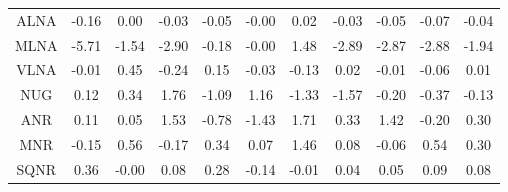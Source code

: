 \documentclass[11pt,a4paper]{report}
\begin{document}
\begin{longtable}{ | c || c | c | c | c | c | c | c | c | c || c |}
ALNA &  \cellcolor[HTML]{FFFFFF} -0.16 &  \cellcolor[HTML]{FFFFFF} 0.00 &  \cellcolor[HTML]{FFFFFF} -0.03 &  \cellcolor[HTML]{FFFFFF} -0.05 &  \cellcolor[HTML]{FFFFFF} -0.00 &  \cellcolor[HTML]{FFFFFF} 0.02 &  \cellcolor[HTML]{FFFFFF} -0.03 &  \cellcolor[HTML]{FFFFFF} -0.05 &  \cellcolor[HTML]{FFFFFF} -0.07 &  \cellcolor[HTML]{FFFFFF} -0.04 \\
MLNA &  \cellcolor[HTML]{FF7070} -5.71 &  \cellcolor[HTML]{FFD7D7} -1.54 &  \cellcolor[HTML]{FFB7B7} -2.90 &  \cellcolor[HTML]{FFF7F7} -0.18 &  \cellcolor[HTML]{FFFFFF} -0.00 &  \cellcolor[HTML]{D7D7FF} 1.48 &  \cellcolor[HTML]{FFB7B7} -2.89 &  \cellcolor[HTML]{FFB7B7} -2.87 &  \cellcolor[HTML]{FFB7B7} -2.88 &  \cellcolor[HTML]{FFCFCF} -1.94 \\
VLNA &  \cellcolor[HTML]{FFFFFF} -0.01 &  \cellcolor[HTML]{F7F7FF} 0.45 &  \cellcolor[HTML]{FFF7F7} -0.24 &  \cellcolor[HTML]{FFFFFF} 0.15 &  \cellcolor[HTML]{FFFFFF} -0.03 &  \cellcolor[HTML]{FFFFFF} -0.13 &  \cellcolor[HTML]{FFFFFF} 0.02 &  \cellcolor[HTML]{FFFFFF} -0.01 &  \cellcolor[HTML]{FFFFFF} -0.06 &  \cellcolor[HTML]{FFFFFF} 0.01 \\
NUG &  \cellcolor[HTML]{FFFFFF} 0.12 &  \cellcolor[HTML]{F7F7FF} 0.34 &  \cellcolor[HTML]{CFCFFF} 1.76 &  \cellcolor[HTML]{FFE7E7} -1.09 &  \cellcolor[HTML]{DFDFFF} 1.16 &  \cellcolor[HTML]{FFDFDF} -1.33 &  \cellcolor[HTML]{FFD7D7} -1.57 &  \cellcolor[HTML]{FFF7F7} -0.20 &  \cellcolor[HTML]{FFF7F7} -0.37 &  \cellcolor[HTML]{FFFFFF} -0.13 \\
ANR &  \cellcolor[HTML]{FFFFFF} 0.11 &  \cellcolor[HTML]{FFFFFF} 0.05 &  \cellcolor[HTML]{D7D7FF} 1.53 &  \cellcolor[HTML]{FFEFEF} -0.78 &  \cellcolor[HTML]{FFD7D7} -1.43 &  \cellcolor[HTML]{D7D7FF} 1.71 &  \cellcolor[HTML]{F7F7FF} 0.33 &  \cellcolor[HTML]{DFDFFF} 1.42 &  \cellcolor[HTML]{FFF7F7} -0.20 &  \cellcolor[HTML]{F7F7FF} 0.30 \\
MNR &  \cellcolor[HTML]{FFFFFF} -0.15 &  \cellcolor[HTML]{EFEFFF} 0.56 &  \cellcolor[HTML]{FFF7F7} -0.17 &  \cellcolor[HTML]{F7F7FF} 0.34 &  \cellcolor[HTML]{FFFFFF} 0.07 &  \cellcolor[HTML]{D7D7FF} 1.46 &  \cellcolor[HTML]{FFFFFF} 0.08 &  \cellcolor[HTML]{FFFFFF} -0.06 &  \cellcolor[HTML]{EFEFFF} 0.54 &  \cellcolor[HTML]{F7F7FF} 0.30 \\
SQNR &  \cellcolor[HTML]{F7F7FF} 0.36 &  \cellcolor[HTML]{FFFFFF} -0.00 &  \cellcolor[HTML]{FFFFFF} 0.08 &  \cellcolor[HTML]{F7F7FF} 0.28 &  \cellcolor[HTML]{FFFFFF} -0.14 &  \cellcolor[HTML]{FFFFFF} -0.01 &  \cellcolor[HTML]{FFFFFF} 0.04 &  \cellcolor[HTML]{FFFFFF} 0.05 &  \cellcolor[HTML]{FFFFFF} 0.09 &  \cellcolor[HTML]{FFFFFF} 0.08 \\

\end{longtable}
\end{document}
